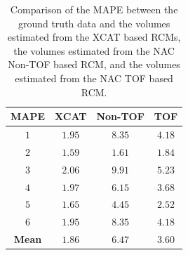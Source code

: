            \begin{table}
                \centering
                
                \captionsetup{singlelinecheck=false}
                \caption{
                    Comparison of the \gls{MAPE} between the ground truth data and the volumes estimated from the \gls{XCAT} based \glspl{RCM}, the volumes estimated from the \gls{NAC} \gls{Non-TOF} based \gls{RCM}, and the volumes estimated from the \gls{NAC} \gls{TOF} based \gls{RCM}.
                }
                
                \resizebox*{1.0\linewidth}{!}
                {
                    \begin{tabular}{||c|ccc||}
                        \hline
                        \textbf{\gls{MAPE}} & \textbf{XCAT}     & \textbf{\gls{Non-TOF}}    & \textbf{\gls{TOF}} \\
                        \hline
                        \textbf{$1$}        & $1.95$            & $8.35$                    & $4.18$ \\
                        \textbf{$2$}        & $1.59$            & $1.61$                    & $1.84$ \\
                        \textbf{$3$}        & $2.06$            & $9.91$                    & $5.23$ \\
                        \textbf{$4$}        & $1.97$            & $6.15$                    & $3.68$ \\
                        \textbf{$5$}        & $1.65$            & $4.45$                    & $2.52$ \\
                        \textbf{$6$}        & $1.95$            & $8.35$                    & $4.18$ \\
                        \hline
                        \textbf{Mean}       & $1.86$            & $6.47$                    & $3.60$ \\
                        \hline
                    \end{tabular}
                } \label{tab:impact_of_tof_on_respiratory_motion_model_estimation_using_pre_gated_no_intra_cycle_motion_nac_pet_results_mape}
            \end{table}
            
